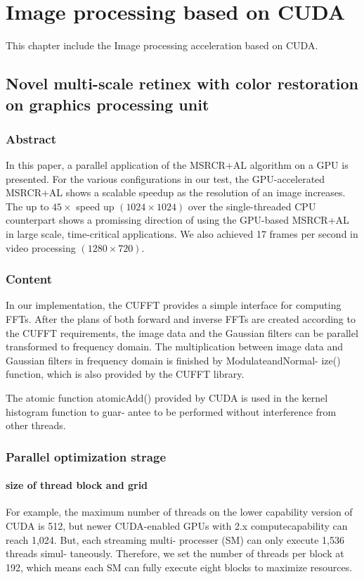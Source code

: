\chapter{Image processing based on CUDA}

This chapter include the Image processing acceleration based on CUDA.

\section{Novel multi-scale retinex with color restoration on graphics processing unit}
\subsection{Abstract}
In this paper, a parallel application of the MSRCR+AL algorithm on a GPU is presented. For the various configurations in our test, the GPU-accelerated MSRCR+AL shows a scalable speedup as the resolution of an image increases. The up to $45 \times$ speed up $(1024 \times 1024)$ over the single-threaded CPU counterpart shows a promissing direction of using the GPU-based MSRCR+AL in large scale, time-critical applications. We also achieved 17 frames per second in video processing $(1280 \times 720)$. 

\subsection{Content}
In our implementation, the CUFFT provides a simple
interface for computing FFTs. After the plans of both
forward and inverse FFTs are created according to the
CUFFT requirements, the image data and the Gaussian
filters can be parallel transformed to frequency domain.
The multiplication between image data and Gaussian filters
in frequency domain is finished by ModulateandNormal-
ize() function, which is also provided by the CUFFT
library.

The atomic function atomicAdd() provided by
CUDA is used in the kernel histogram function to guar-
antee to be performed without interference from other
threads.
\subsection{Parallel optimization strage}
\subsubsection{size of thread block and grid}
For example, the maximum number of
threads on the lower capability version of CUDA is
512, but newer CUDA-enabled GPUs with 2.x computecapability can reach 1,024. But, each streaming multi-
processer (SM) can only execute 1,536 threads simul-
taneously. Therefore, we set the number of threads per
block at 192, which means each SM can fully execute
eight blocks to maximize resources.
